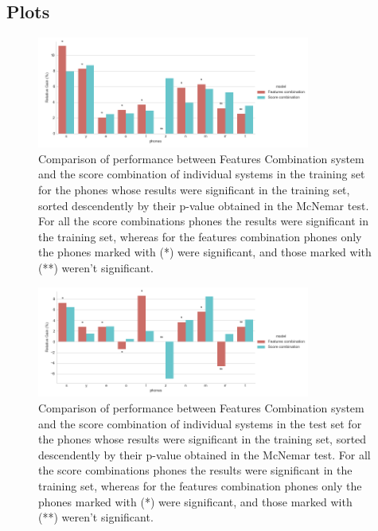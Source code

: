 \subsection{Plots}

\begin{figure}[H]
	\centering
	\includegraphics[width=0.8\textwidth]{files/figures/results/relatives/relatives-fusion-systems-dev-mcnemar.png}
	\caption{Comparison of performance between Features Combination system and the score combination
	of individual systems in the training set for the phones whose results were significant 
	in the training set, sorted descendently by their p-value obtained in the McNemar test. 
	For all the score combinations phones the results were significant in the training set,
	whereas for the features combination phones only the phones marked with (*) were significant, 
	and those marked with (**) weren't significant.}
	\label{fig:fusionMcnemarDev}
\end{figure}

\begin{figure}[H]
	\centering
	\includegraphics[width=0.8\textwidth]{files/figures/results/relatives/relative-fusion-systems-heldout-mcnemar.png}
	\caption{Comparison of performance between Features Combination system and the score combination
	of individual systems in the test set for the phones whose results were significant 
	in the training set, sorted descendently by their p-value obtained in the McNemar test. 
	For all the score combinations phones the results were significant in the training set,
	whereas for the features combination phones only the phones marked with (*) were significant, 
	and those marked with (**) weren't significant.}
	\label{fig:fusionMcnemarTest}
\end{figure}
